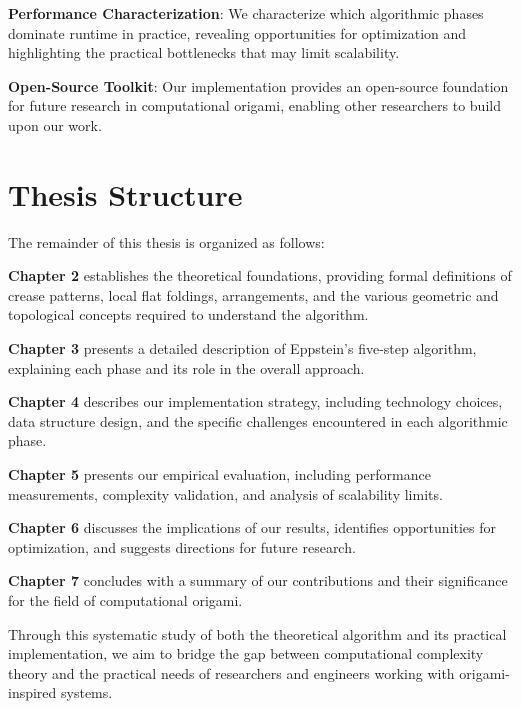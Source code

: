\textbf{Performance Characterization}: We characterize which algorithmic phases dominate runtime in practice, revealing opportunities for optimization and highlighting the practical bottlenecks that may limit scalability.

\textbf{Open-Source Toolkit}: Our implementation provides an open-source foundation for future research in computational origami, enabling other researchers to build upon our work.

\section{Thesis Structure}

The remainder of this thesis is organized as follows:

\textbf{Chapter 2} establishes the theoretical foundations, providing formal definitions of crease patterns, local flat foldings, arrangements, and the various geometric and topological concepts required to understand the algorithm.

\textbf{Chapter 3} presents a detailed description of Eppstein's five-step algorithm, explaining each phase and its role in the overall approach.

\textbf{Chapter 4} describes our implementation strategy, including technology choices, data structure design, and the specific challenges encountered in each algorithmic phase.

\textbf{Chapter 5} presents our empirical evaluation, including performance measurements, complexity validation, and analysis of scalability limits.

\textbf{Chapter 6} discusses the implications of our results, identifies opportunities for optimization, and suggests directions for future research.

\textbf{Chapter 7} concludes with a summary of our contributions and their significance for the field of computational origami.

Through this systematic study of both the theoretical algorithm and its practical implementation, we aim to bridge the gap between computational complexity theory and the practical needs of researchers and engineers working with origami-inspired systems.